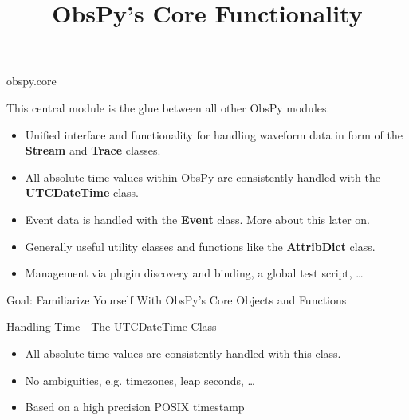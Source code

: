 
\title{ObsPy's Core Functionality}


\frame[plain]{\titlepage}

\begin{frame}{obspy.core}

This central module is the glue between all other ObsPy modules.

    \begin{itemize}
        \item Unified interface and functionality for handling waveform data in
            form of the \textbf{Stream} and \textbf{Trace} classes.
        \item All absolute time values within ObsPy are consistently handled
            with the \textbf{UTCDateTime} class.
        \item Event data is handled with the \textbf{Event} class. More about
            this later on.
        \item Generally useful utility classes and functions like the
            \textbf{AttribDict} class.
        \item Management via plugin discovery and binding, a global test
            script, \ldots
    \end{itemize}
\end{frame}


\begin{frame}{}
    \begin{center}
        \textcolor{lmu@darkgreen}{\LARGE{Goal: Familiarize Yourself With ObsPy's Core Objects and Functions}}
    \end{center}
\end{frame}


\begin{frame}{Handling Time - The UTCDateTime Class}
    \begin{itemize}
        \item All absolute time values are consistently handled with this class.
        \item No ambiguities, e.g. timezones, leap seconds, \dots
        \item Based on a high precision POSIX timestamp
    \end{itemize}
\end{frame}


